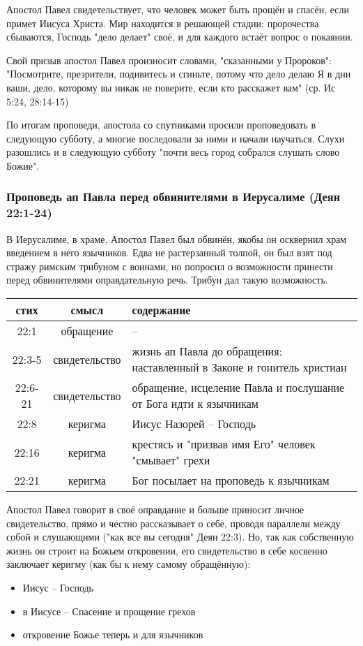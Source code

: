 Апостол Павел свидетельствует, что человек может быть прощён и спасён, если примет Иисуса Христа.
Мир находится в решающей стадии: пророчества сбываются, Господь "дело делает" своё, и для каждого встаёт вопрос о покаянии.

Свой призыв апостол Павел произносит словами, "сказанными у Пророков": "Посмотрите, презрители, подивитесь и сгиньте, потому что дело делаю Я в дни ваши, дело, которому вы никак не поверите, если кто расскажет вам" (ср. Ис 5:24, 28:14-15)

По итогам проповеди, апостола со спутниками просили проповедовать в следующую субботу, а многие последовали за ними и начали научаться.
Слухи разошлись и в следующую субботу "почти весь город собрался слушать слово Божие".

\subsubsection*{Проповедь ап Павла перед обвинителями в Иерусалиме (Деян 22:1-24)}
В Иерусалиме, в храме, Апостол Павел был обвинён, якобы он осквернил храм введением в него язычников.
Едва не растерзанный толпой, он был взят под стражу римским трибуном с воинами, но попросил о возможности принести перед обвинителями оправдательную речь.
Трибун дал такую возможность.

\begin{center}
	\begin{longtable}{ |c|c|p{}| } 
		\hline
		стих & смысл & содержание \\
		\hline\hline
		22:1 & обращение & – \\
		22:3-5 & свидетельство & жизнь ап Павла до обращения: наставленный в Законе и гонитель христиан \\ 
		22:6-21 & свидетельство & обращение, исцеление Павла и послушание от Бога идти к язычникам \\
		22:8 & керигма & Иисус Назорей – Господь \\
		22:16 & керигма & крестясь и "призвав имя Его" человек "смывает" грехи \\
		22:21 & керигма & Бог посылает на проповедь к язычникам \\
		\hline
	\end{longtable}
\end{center}

Апостол Павел говорит в своё оправдание и больше приносит личное свидетельство, прямо и честно рассказывает о себе, проводя параллели между собой и слушающими ("как все вы сегодня" Деян 22:3).
Но, так как собственную жизнь он строит на Божьем откровении, его свидетельство в себе косвенно заключает керигму (как бы к нему самому обращённую):
\begin{itemize}
	\item Иисус – Господь
	\item в Иисусе – Спасение и прощение грехов
	\item откровение Божье теперь и для язычников
\end{itemize} 


